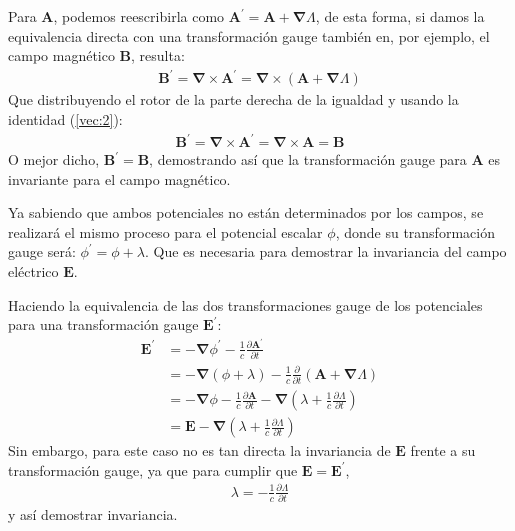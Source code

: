 \begin{multicols}{2}
Para $\mathbf{A}$, podemos reescribirla como $\mathbf{A}^{\prime} = \mathbf{A} + \mathbf{\nabla}\Lambda$, de esta forma, si damos la equivalencia directa con una transformación gauge también en, por ejemplo, el campo magnético $\mathbf{B}$, resulta:
\begin{align*}
    \mathbf{B}^{\prime} = \mathbf{\nabla} \times \mathbf{A}^{\prime} = \mathbf{\nabla} \times \left(\mathbf{A} + \mathbf{\nabla}\Lambda\right)
\end{align*}
Que distribuyendo el rotor de la parte derecha de la igualdad y usando la identidad (\ref{vec:2}):
\begin{align*}
    \mathbf{B}^{\prime} = \mathbf{\nabla} \times \mathbf{A}^{\prime} = \mathbf{\nabla} \times \mathbf{A} = \mathbf{B}
\end{align*}
O mejor dicho, $\mathbf{B}^{\prime} = \mathbf{B}$, demostrando así que la transformación gauge para $\mathbf{A}$ es invariante para el campo magnético.

Ya sabiendo que ambos potenciales no están determinados por los campos, se realizará el mismo proceso para el potencial escalar $\phi$, donde su transformación gauge será: $\phi^{\prime} = \phi + \lambda$. Que es necesaria para demostrar la invariancia del campo eléctrico $\mathbf{E}$.

Haciendo la equivalencia de las dos transformaciones gauge de los potenciales para una transformación gauge $\mathbf{E}^{\prime}$:
\begin{align*}
    \mathbf{E}^{\prime} &= -\mathbf{\nabla} \phi^{\prime} - \frac{1}{c} \frac{\partial \mathbf{A}^{\prime}}{\partial t}\\
    &= -\mathbf{\nabla} \left(\phi + \lambda\right) - \frac{1}{c} \frac{\partial}{\partial t} \left(\mathbf{A} + \mathbf{\nabla}\Lambda\right)\\
    &= -\mathbf{\nabla} \phi - \frac{1}{c} \frac{\partial \mathbf{A}}{\partial t} - \mathbf{\nabla} \left(\lambda + \frac{1}{c} \frac{\partial \Lambda}{\partial t}\right)\\
    &= \mathbf{E} - \mathbf{\nabla} \left(\lambda + \frac{1}{c} \frac{\partial \Lambda}{\partial t}\right)
\end{align*}
Sin embargo, para este caso no es tan directa la invariancia de $\mathbf{E}$ frente a su transformación gauge, ya que para cumplir que $\mathbf{E} = \mathbf{E}^{\prime}$,
\begin{align*}
    \lambda = - \frac{1}{c} \frac{\partial \Lambda}{\partial t}
\end{align*}
y así demostrar invariancia.


\end{multicols}
